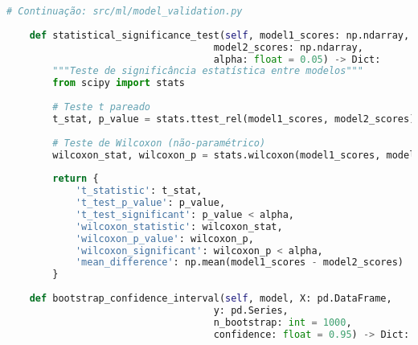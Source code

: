 \begin{pythonbox}
\begin{lstlisting}[language=Python]
# Continuação: src/ml/model_validation.py
    
    def statistical_significance_test(self, model1_scores: np.ndarray,
                                    model2_scores: np.ndarray,
                                    alpha: float = 0.05) -> Dict:
        """Teste de significância estatística entre modelos"""
        from scipy import stats
        
        # Teste t pareado
        t_stat, p_value = stats.ttest_rel(model1_scores, model2_scores)
        
        # Teste de Wilcoxon (não-paramétrico)
        wilcoxon_stat, wilcoxon_p = stats.wilcoxon(model1_scores, model2_scores)
        
        return {
            't_statistic': t_stat,
            't_test_p_value': p_value,
            't_test_significant': p_value < alpha,
            'wilcoxon_statistic': wilcoxon_stat,
            'wilcoxon_p_value': wilcoxon_p,
            'wilcoxon_significant': wilcoxon_p < alpha,
            'mean_difference': np.mean(model1_scores - model2_scores)
        }
    
    def bootstrap_confidence_interval(self, model, X: pd.DataFrame, 
                                    y: pd.Series, 
                                    n_bootstrap: int = 1000,
                                    confidence: float = 0.95) -> Dict:

\end{lstlisting}
\end{pythonbox}
